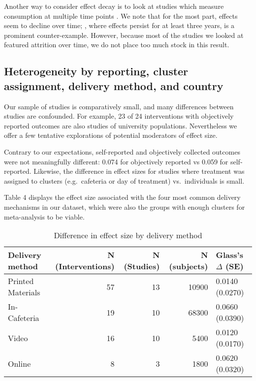 \documentclass[sn-nature,referee,pdflatex]{sn-jnl}
\begin{document}
Another way to consider effect decay is to look at studies which measure
consumption at multiple time points
\citetext{\citealp[e.g.][]{bianchi202022}; \citealp[@bschaden2020, @carfora2023]{bochmann2022}; \citealp{jalil2023}}.
We note that for the most part, effects seem to decline over time;
\citep{jalil2023}, where effects persist for at least three years, is a
prominent counter-example. However, because most of the studies we
looked at featured attrition over time, we do not place too much stock
in this result.

\begin{comment} There is probably a way to do this quantitatively and if we get asked to do it in review, I'll do it, but it's a fair bit of work and I think we've made the general point 
\end{comment}

\subsection{Heterogeneity by reporting, cluster assignment, delivery
method, and country}\label{sec2.11}

Our sample of studies is comparatively small, and many differences
between studies are confounded. For example, 23 of 24 interventions with
objectively reported outcomes are also studies of university
populations. Nevertheless we offer a few tentative explorations of
potential moderators of effect size.

Contrary to our expectations, self-reported and objectively collected
outcomes were not meaningfully different: 0.074 for objectively reported
vs 0.059 for self-reported. Likewise, the difference in effect sizes for
studies where treatment was assigned to clusters (e.g.~cafeteria or day
of treatment) vs.~individuals is small.

Table 4 displays the effect size associated with the four most common
delivery mechanisms in our dataset, which were also the groups with
enough clusters for meta-analysis to be viable.

\begin{table}[!h]
\centering
\caption{\label{tab:table_four}Difference in effect size by delivery method}
\centering
\begin{tabular}[t]{lrrrl}
\toprule
Delivery method & N (Interventions) & N (Studies) & N (subjects) & Glass's $\Delta$ (SE)\\
\midrule
Printed Materials & 57 & 13 & 10900 & 0.0140 (0.0270)\\
In-Cafeteria & 19 & 10 & 68300 & 0.0660 (0.0390)\\
Video & 16 & 10 & 5400 & 0.0120 (0.0170)\\
Online & 8 & 3 & 1800 & 0.0620 (0.0320)\\
\bottomrule
\end{tabular}
\end{table}
\end{document}
